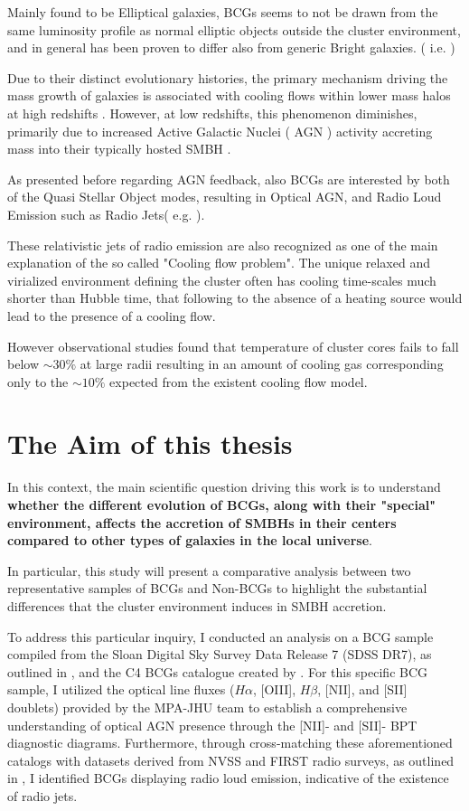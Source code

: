 Mainly found to be Elliptical galaxies, BCGs seems to not be drawn from the same luminosity profile as normal elliptic objects outside the cluster environment, and in general has been proven to differ also from generic Bright galaxies.
 ( i.e. \cite{1977ApJ...212..311T}) 
  
Due to their distinct evolutionary histories, the primary mechanism driving the mass growth of galaxies is associated with cooling flows within lower mass halos at high redshifts \cite{2006ApJ...652..216R}.
However, at low redshifts, this phenomenon diminishes, primarily due to increased Active Galactic Nuclei ( AGN ) activity accreting mass into their typically hosted SMBH .
 
As presented before regarding AGN feedback, also BCGs are interested by both of the Quasi Stellar Object modes, resulting in Optical AGN, and Radio Loud Emission such as Radio Jets( e.g. \cite{2007MNRAS.379..867V} ).

These relativistic jets of radio emission are also recognized as one of the main explanation of the so called "Cooling flow problem". The unique relaxed and virialized environment defining the cluster often has cooling time-scales much shorter than Hubble time, that following to the absence of a heating source would lead to the presence of a cooling flow.

However observational studies found that temperature of cluster cores fails to fall below $\sim 30\%$ at large radii resulting in an amount of cooling gas corresponding only to the $\sim 10\%$ expected from the existent cooling flow model. \cite{David_2001}

\newpage
\section{The Aim of this thesis}
In this context, the main scientific question driving this work is to understand \textbf{whether the different evolution of BCGs, along with their "special" environment, affects the accretion of SMBHs in their centers compared to other types of galaxies in the local universe}.

In particular, this study will present a comparative analysis between two representative samples of BCGs and Non-BCGs to highlight the substantial differences that the cluster environment induces in SMBH accretion.


To address this particular inquiry, I conducted an analysis on a BCG sample compiled from the Sloan Digital Sky Survey Data Release 7 (SDSS DR7), as outlined in \cite{2009ApJS..182..543A}, and the C4 BCGs catalogue created by \cite{2007MNRAS.379..867V}. For this specific BCG sample, I utilized the optical line fluxes ($H\alpha$, [OIII], $H\beta$, [NII], and [SII] doublets) provided by the MPA-JHU team to establish a comprehensive understanding of optical AGN presence through the [NII]- and [SII]- BPT diagnostic diagrams. Furthermore, through cross-matching these aforementioned catalogs with datasets derived from NVSS and FIRST radio surveys, as outlined in \cite{2005MNRAS.362....9B}, I identified BCGs displaying radio loud emission, indicative of the existence of radio jets.

